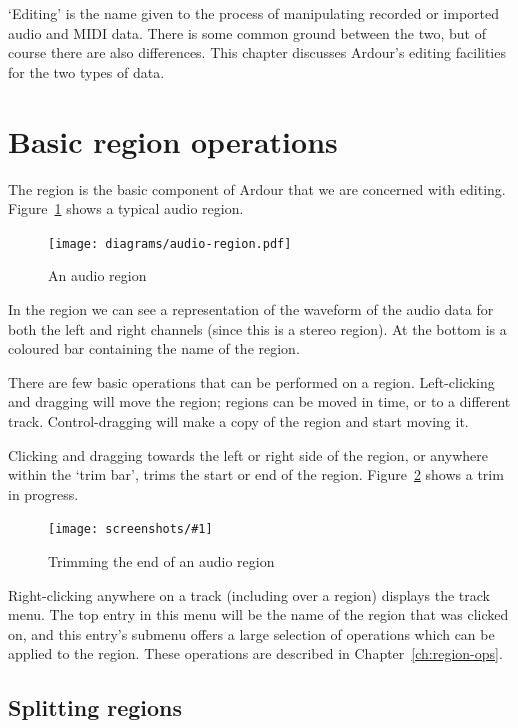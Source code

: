 \documentclass[10pt,a4paper]{book}
\newcommand{\modone}{Control}
\newcommand{\screenshot}[3]{%
\begin{figure}[ht]%
\begin{center}
\texttt{[image: screenshots/\#1]}
\end{center}
\caption{#2}
\label{#3}
\end{figure}}
\begin{document}
{`Editing' is the name given to the process of manipulating recorded or
imported audio and MIDI data.  There is some common ground between the
two, but of course there are also differences.  This chapter discusses
Ardour's editing facilities for the two types of data.


\section{Basic region operations}

The region is the basic component of Ardour that we are concerned with
editing.  Figure~\ref{fig:audio-region} shows a typical audio region.

\begin{figure}[ht]
\begin{center}
\texttt{[image: diagrams/audio-region.pdf]}
\end{center}
\caption{An audio region}
\label{fig:audio-region}
\end{figure}

In the region we can see a representation of the waveform of the audio
data for both the left and right channels (since this is a stereo
region).  At the bottom is a coloured bar containing the name of the
region.

There are few basic operations that can be performed on a region.
Left-clicking and dragging will move the region; regions can be moved
in time, or to a different track.  \modone{}-dragging will make a copy
of the region and start moving it.  

Clicking and dragging towards the left or right side of the region, or
anywhere within the `trim bar', trims the start or end of the region.
Figure~\ref{fig:audio-region-trim} shows a trim in progress.

\screenshot{region-trim-end.png}{Trimming the end of an audio region}{fig:audio-region-trim}

Right-clicking anywhere on a track (including over a region) displays
the track menu.  The top entry in this menu will be the name of the
region that was clicked on, and this entry's submenu offers a large
selection of operations which can be applied to the region.  These
operations are described in Chapter~\ref{ch:region-ops}.


\subsection{Splitting regions}

}
\end{document}
